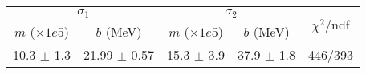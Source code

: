 \begin{tabular}{cc|cc||c}
\multicolumn{2}{c|}{$\sigma_1$} & \multicolumn{2}{|c}{$\sigma_2$}  & \multirow{2}{*}{$\chi^2/$ndf}\\
$m$ ($\times1e5$) & $b$ (MeV) & $m$ ($\times1e5$) & $b$ (MeV)  & \\
\hline
10.3 $\pm$ 1.3 & 21.99 $\pm$ 0.57 & 15.3 $\pm$ 3.9 & 37.9 $\pm$ 1.8 & 446/393\\
\end{tabular}
